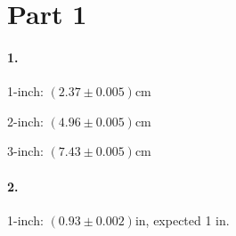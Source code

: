

\usepackage{enumitem}
\usepackage{graphicx}
\graphicspath{ {./lab02images/} }


\renewcommand\assignment{Lab 3: Uncertainty and Error, 2/14/2023, Partners: Maite Valentin-Lugo, Seth Waln}



    \iffalse
    \begin{equation*}
        \begin{gathered}
            Equations go here.
        \end{gathered}
    \end{equation*}

    \resizebox{\hsize}{!}{$Long equation goes here$}

    \begin{multicol*}{# of columns}
    \end{multicol*}

    \horizontal

    \fi


    \section*{Part 1}

    \paragraph*{1.}
    1-inch: $(2.37 \pm 0.005)$cm

    2-inch: $(4.96 \pm 0.005)$cm

    3-inch: $(7.43 \pm 0.005)$cm

    \paragraph*{2.}
    1-inch: $(0.93 \pm 0.002)$in, expected 1 in.

